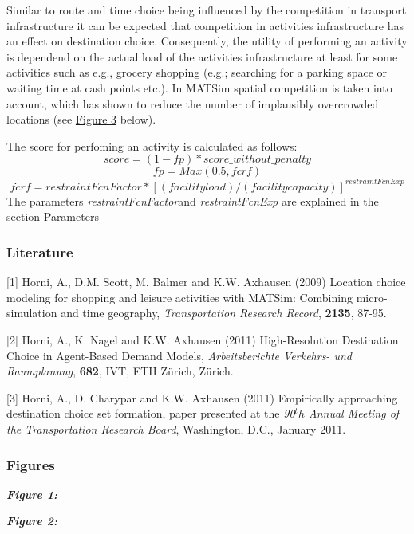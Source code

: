 Similar to route and time choice being influenced by  the competition in transport infrastructure it can be expected that  competition in activities infrastructure has an effect on destination  choice. Consequently, the utility of performing an activity is dependend  on the actual load of the activities infrastructure at least for some  activities such as e.g., grocery shopping (e.g.; searching for a parking  space or waiting time at cash points etc.). In MATSim spatial  competition is taken into account, which has shown to reduce the number  of implausibly overcrowded locations (see \hyperlink{Figure3}{Figure 3} below).

The score for perfoming an activity is calculated as follows:
\[
score = (1- fp) * score\_without\_penalty
\]
\[
fp = Max(0.5, fcrf)
\]
\[
fcrf = restraintFcnFactor * [(facility load) / (facility capacity)]^{restraintFcnExp}
\]
The parameters \emph{restraintFcnFactor}and \emph{restraintFcnExp }are explained in the section \hyperlink{parameters}{Parameters}


\subsubsection{{Literature}}

[1] Horni, A., D.M. Scott, M. Balmer and K.W. Axhausen (2009)  Location choice modeling for shopping and leisure activities with  MATSim: Combining micro-simulation and time geography, \emph{Transportation Research Record}, \textbf{2135}, 87-95.

[2] Horni, A., K. Nagel and K.W. Axhausen (2011) High-Resolution Destination Choice in Agent-Based Demand Models, \emph{Arbeitsberichte Verkehrs- und Raumplanung}, \textbf{682}, IVT, ETH Zürich, Zürich.

[3] Horni, A., D. Charypar and K.W. Axhausen (2011) Empirically  approaching destination choice set formation, paper presented at the \emph{90$^th$ Annual Meeting of the Transportation Research Board}, Washington, D.C., January 2011.

\subsubsection{Figures}

\emph{\textbf{Figure 1:}}






\emph{\textbf{Figure 2:}}


